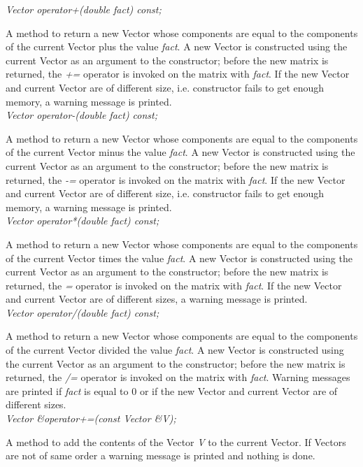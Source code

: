 {\em Vector operator+(double fact) const;} 

A method to return a new Vector whose components are equal to the
components of the current Vector plus the value {\em fact}. A new Vector
is constructed using the current Vector as an argument to the
constructor; before the new matrix is returned, the {\em +=} operator
is invoked on the matrix with {\em fact}. If the new Vector and
current Vector are of different size, i.e. constructor fails to get
enough memory, a warning message is printed. \\ 

{\em Vector operator-(double fact) const;} 

A method to return a new Vector whose components are equal to the
components of the current Vector minus the value {\em fact}.  A new Vector
is constructed using the current Vector as an argument to the
constructor; before the new matrix is returned, the {\em -=} operator
is invoked on the matrix with {\em fact}. If the new Vector and
current Vector are of different size, i.e. constructor fails to get
enough memory, a warning message is printed. \\ 


{\em  Vector operator*(double fact) const;} 

A method to return a new Vector whose components are equal to the
components of the current Vector times the value {\em fact}.  A new Vector
is constructed using the current Vector as an argument to the
constructor; before the new matrix is returned, the {\em *=} operator
is invoked on the matrix with {\em fact}. If the new Vector and
current Vector are of different sizes, a warning message is printed. \\


{\em  Vector operator/(double fact) const;} 

A method to return a new Vector whose components are equal to the
components of the current Vector divided the value {\em fact}. A new
Vector is constructed using the current Vector as an argument to the
constructor; before the new matrix is returned, the {\em /=} operator
is invoked on the matrix with {\em fact}. Warning messages are printed
if {\em fact} is equal to $0$ or if the new Vector and current Vector
are of different sizes. \\ 

{\em  Vector \&operator+=(const Vector \&V);} 

A method to add the contents of the Vector {\em V} to the current
Vector. If Vectors are not of same order a warning message is printed
and nothing is done.  \\ 

